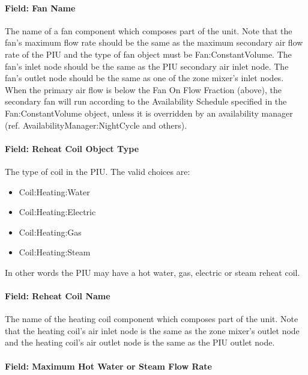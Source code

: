 \paragraph{Field: Fan Name}\label{field-fan-name-2}

The name of a fan component which composes part of the unit. Note that the fan's maximum flow rate should be the same as the maximum secondary air flow rate of the PIU and the type of fan object must be Fan:ConstantVolume. The fan's inlet node should be the same as the PIU secondary air inlet node. The fan's outlet node should be the same as one of the zone mixer's inlet nodes. When the primary air flow is below the Fan On Flow Fraction (above), the secondary fan will run according to the Availability Schedule specified in the Fan:ConstantVolume object, unless it is overridden by an availability manager (ref. AvailabilityManager:NightCycle and others).

\paragraph{Field: Reheat Coil Object Type}\label{field-reheat-coil-object-type-4}

The type of coil in the PIU. The valid choices are:

\begin{itemize}
\item
  Coil:Heating:Water
\item
  Coil:Heating:Electric
\item
  Coil:Heating:Gas
\item
  Coil:Heating:Steam
\end{itemize}

In other words the PIU may have a hot water, gas, electric or steam reheat coil.

\paragraph{Field: Reheat Coil Name}\label{field-reheat-coil-name-4}

The name of the heating coil component which composes part of the unit. Note that the heating coil's air inlet node is the same as the zone mixer's outlet node and the heating coil's air outlet node is the same as the PIU outlet node.

\paragraph{Field: Maximum Hot Water or Steam Flow Rate}\label{field-maximum-hot-water-or-steam-flow-rate-5}

